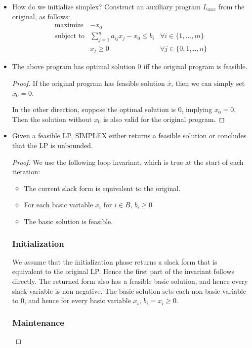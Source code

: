 \begin{itemize}
\item How do we initialize simplex? Construct an auxiliary program
  $L_{aux}$ from the original, as follows:
\begin{align*}
  \text{maximize} & -x_0 \\
  \text{subject to} & \sum_{j=1}^n a_{ij}x_j - x_0 \leq b_i & \forall i \in \{1,...,m\} \\
                    & x_j \geq 0 & \forall j \in \{0,1,..,n\}
\end{align*}

\item The above program has optimal solution $0$ iff the original
  program is feasible.
  \begin{proof}
    If the original program has feasible solution $\overline{x}$, then
    we can simply set $x_0 = 0$.

    In the other direction, suppose the optimal solution is $0$,
    implying $x_0 = 0$. Then the solution without $x_0$ is also valid
    for the original program.
  \end{proof}

\item Given a feasible LP, SIMPLEX either returns a feasible solution
  or concludes that the LP is unbounded.
  \begin{proof}
    We use the following loop invariant, which is true at the start of
    each iteration:
    \begin{itemize}
    \item The current slack form is equivalent to the original.
    \item For each basic variable $x_i$ for $i \in B$, $b_i \geq 0$
    \item The basic solution is feasible.
    \end{itemize}

    \subsubsection{Initialization}

    We assume that the initialization phase returns a slack form that
    is equivalent to the original LP. Hence the first part of the
    invariant follows directly. The returned form also has a feasible
    basic solution, and hence every slack variable is
    non-negative. The basic solution sets each non-basic variable to
    $0$, and hence for every basic variable $x_i$, $b_i = x_i \geq
    0$.

    \subsubsection{Maintenance}


\end{proof}
\end{itemize}
